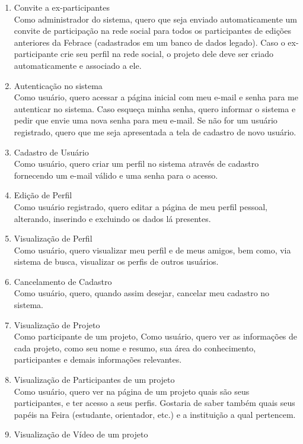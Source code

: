     \begin{enumerate}
      \item Convite a ex-participantes \\
        Como administrador do sistema, quero que seja enviado automaticamente um convite de participação na rede social para todos os participantes de edições anteriores da Febrace (cadastrados em um banco de dados legado). Caso o ex-participante crie seu perfil na rede social, o projeto dele deve ser criado automaticamente e associado a ele.
      \item Autenticação no sistema \\
        Como usuário, quero acessar a página inicial com meu e-mail e senha para me autenticar no sistema. Caso esqueça minha senha, quero informar o sistema e pedir que envie uma nova senha para meu e-mail. Se não for um usuário registrado, quero que me seja apresentada a tela de cadastro de novo usuário.
      \item Cadastro de Usuário \\
        Como usuário, quero criar um perfil no sistema através de cadastro fornecendo um e-mail válido e uma senha para o acesso.
      \item Edição de Perfil \\
        Como usuário registrado, quero editar a página de meu perfil pessoal, alterando, inserindo e excluindo os dados lá presentes.
      \item Visualização de Perfil \\
        Como usuário, quero visualizar meu perfil e de meus amigos, bem como, via sistema de busca, visualizar os perfis de outros usuários.
      \item Cancelamento de Cadastro \\
        Como usuário, quero, quando assim desejar, cancelar meu cadastro no sistema.
      \item Visualização de Projeto \\Como participante de um projeto,
        Como usuário, quero ver as informações de cada projeto, como seu nome e resumo, sua área do conhecimento, participantes e demais informações relevantes.
      \item Visualização de Participantes de um projeto \\
        Como usuário, quero ver na página de um projeto quais são seus participantes, e ter acesso a seus perfis. Gostaria de saber também quais seus papéis na Feira (estudante, orientador, etc.) e a instituição a qual pertencem.
      \item Visualização de Vídeo de um projeto \\

\end{enumerate}
